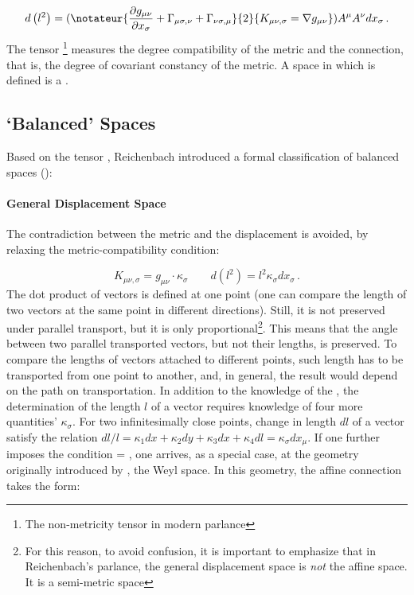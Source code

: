 \documentclass[submitted]{article}
\begin{document}
\begin{equation}\label{eq:nonmetricity}
{d}\left(l^{2}\right)=(\notateur{{\frac{\partial {g}_{\mu \nu}}{\partial {x}_{\sigma}}+\Gamma_{\mu \sigma, \nu}+\Gamma_{\nu \sigma, \mu}}}{2}{{K}_{\mu \nu, \sigma}=\nabla \gmn}) {A}^{\mu} {A}^{\nu} {d} {x}_{\sigma}\,.
\end{equation}
%
The tensor \nonmetr\footnote{The non-metricity tensor in modern parlance} measures the degree compatibility of the metric and the connection, that is, the degree of covariant constancy of the metric. A space in which \nonmetr is defined is a .
 
\subsection{`Balanced' Spaces}

Based on the tensor \nonmetr, Reichenbach introduced a formal classification of balanced spaces ():

\paragraph{General Displacement Space} The contradiction between the metric and the displacement is avoided, by relaxing the metric-compatibility condition: 

\begin{equation*}
K_{\mu \nu, \sigma}=g_{\mu \nu} \cdot \kappa_{\sigma} \quad \quad d\left({l}^{2}\right)={l}^{2} \kappa_\sigma dx_\sigma\,.
\end{equation*}
%
The dot product of vectors is defined at one point (one can compare the length of two vectors at the same point in different directions). Still, it is not preserved under parallel transport, but it is only proportional\footnote{For this reason, to avoid confusion, it is important to emphasize that in Reichenbach's parlance, the general displacement space is \emph{not} the affine space. It is a semi-metric space}. This means that the angle between two parallel transported vectors, but not their lengths, is preserved. To compare the lengths of vectors attached to different points, such length has to be transported from one point to another, and, in general, the result would depend on the path on transportation. In addition to the knowledge of the \gmn, the determination of the length $l$ of a vector requires knowledge of four more quantities' $\kappa_\sigma$. For two infinitesimally close points, change in length $dl$ of a vector satisfy the relation $dl/l =\kappa_{1} d x+\kappa_{2} d y+\kappa_{3} d x+\kappa_{4} d l=\kappa_{\sigma} d x_{\mu}$. If one further imposes the condition \Gtmn = \Gtmn, one arrives, as a special case, at the geometry originally introduced by \citet{Weyl1918a}, the Weyl space. In this geometry, the affine connection takes the form:
\end{document}
